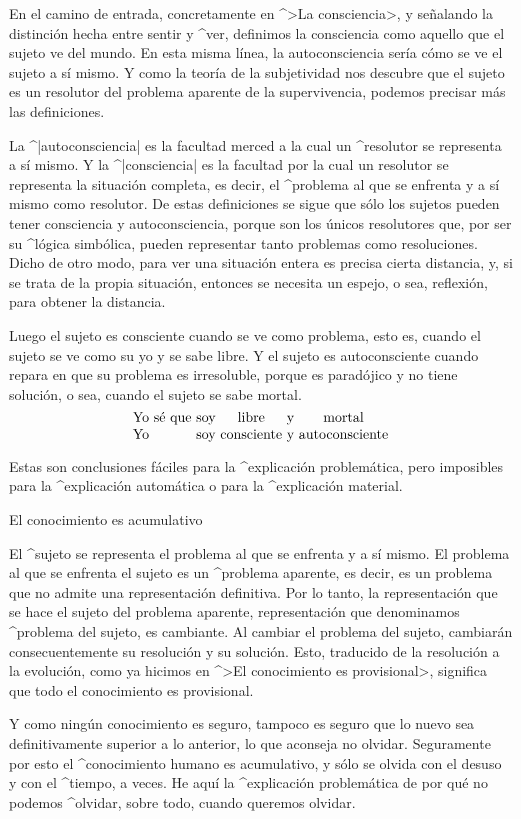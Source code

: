 En el camino de entrada, concretamente en ^>La consciencia>, y señalando
la distinción hecha entre sentir y ^{ver}, definimos la consciencia como
aquello que el sujeto ve del mundo. En esta misma línea, la
autoconsciencia sería cómo se ve el sujeto a sí mismo. Y como la teoría
de la subjetividad nos descubre que el sujeto es un resolutor del
problema aparente de la supervivencia, podemos precisar más las
definiciones.

La ^|autoconsciencia| es la facultad merced a la cual un ^{resolutor} se
representa a sí mismo. Y la ^|consciencia| es la facultad por la cual un
resolutor se representa la situación completa, es decir, el ^{problema}
al que se enfrenta y a sí mismo como resolutor. De estas definiciones se
sigue que sólo los sujetos pueden tener consciencia y autoconsciencia,
porque son los únicos resolutores que, por ser su ^{lógica simbólica},
pueden representar tanto problemas como resoluciones. Dicho de otro
modo, para ver una situación entera es precisa cierta distancia, y, si se
trata de la propia situación, entonces se necesita un espejo, o sea,
reflexión, para obtener la distancia.


Luego el sujeto es consciente cuando se ve como problema, esto es,
cuando el sujeto se ve como su yo y se sabe libre. Y el sujeto es
autoconsciente cuando repara en que su problema es irresoluble, porque
es paradójico y no tiene solución, o sea, cuando el sujeto se sabe
mortal.
$$\vbox{\halign{&\hfil#\hfil\cr
  Yo &sé que &soy &libre &y & mortal\cr
  Yo &&soy &consciente &y & autoconsciente\cr}}$$

Estas son conclusiones fáciles para la ^{explicación problemática}, pero
imposibles para la ^{explicación automática} o para la ^{explicación
material}.


\Section El conocimiento es acumulativo

El ^{sujeto} se representa el problema al que se enfrenta y a sí mismo.
El problema al que se enfrenta el sujeto es un ^{problema aparente}, es
decir, es un problema que no admite una representación definitiva. Por
lo tanto, la representación que se hace el sujeto del problema aparente,
representación que denominamos ^{problema del sujeto}, es cambiante. Al
cambiar el problema del sujeto, cambiarán consecuentemente su resolución
y su solución. Esto, traducido de la resolución a la evolución, como ya
hicimos en ^>El conocimiento es provisional>, significa que todo el
conocimiento es provisional.

Y como ningún conocimiento es seguro, tampoco es seguro que lo nuevo sea
definitivamente superior a lo anterior, lo que aconseja no olvidar.
Seguramente por esto el ^{conocimiento} humano es acumulativo, y sólo se
olvida con el desuso y con el ^{tiempo}, a veces. He aquí la
^{explicación problemática} de por qué no podemos ^{olvidar}, sobre
todo, cuando queremos olvidar.


